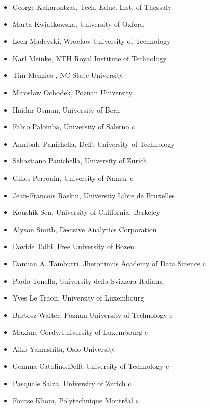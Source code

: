 \begin{itemize}
\smallskip
	\item George Kakarontzas, Tech. Educ. Inst. of Thessaly
\smallskip
	\item Marta Kwiatkowska, University of Oxford
\smallskip
	\item Lech Madeyski, Wroclaw University of Technology
\smallskip
	\item Karl Meinke, KTH Royal Institute of Technology
\smallskip
	\item Tim Menzies , NC State University
\smallskip
	\item Mirosław Ochodek, Poznan University
\smallskip
	\item Haidar Osman, University of Bern
\smallskip
	\item Fabio Palomba, University of Salerno
c \smallskip
	\item Annibale Panichella, Delft University of Technology
\smallskip
	\item Sebastiano Panichella, University of Zurich
\smallskip
	\item Gilles Perrouin, University of Namur
c \smallskip
	\item Jean-Francois Raskin, University Libre de Bruxelles
\smallskip
	\item Koushik Sen, University of California, Berkeley
\smallskip
	\item Alyson Smith, Decisive Analytics Corporation
\smallskip
	\item Davide Taibi, Free University of Bozen
\smallskip
	\item Damian A. Tamburri, Jheronimus Academy of Data Science
c \smallskip
	\item Paolo Tonella, University della Svizzera Italiana
\smallskip
	\item Yves Le Traon, University of Luxembourg
\smallskip
	\item Bartosz Walter, Poznan University of Technology
c \smallskip
	\item Maxime Cordy,University of Luxembourg
c \smallskip
	\item Aiko Yamashita, Oslo University
\smallskip
	\item Gemma Catolino,Delft University of Technology
c \smallskip
	\item Pasquale Salza, University of Zurich
c \smallskip
	\item Foutse Khom, Polytechnique Montréal c \smallskip
\end{itemize}